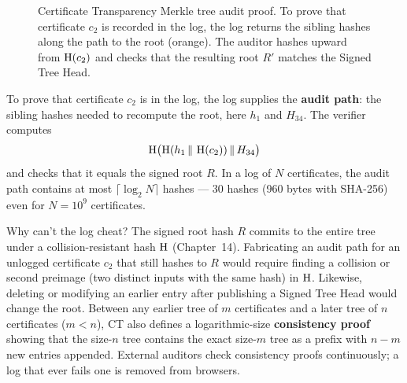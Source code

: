 \begin{figure}[htbp]
\caption{Certificate Transparency Merkle tree audit proof. To prove that certificate $c_2$ is recorded in the log, the log returns the sibling hashes along the path to the root (orange). The auditor hashes upward from $\operatorname{H}(c_2)$ and checks that the resulting root $R'$ matches the Signed Tree Head.}
\label{ch24:fig-ct-tree}
\end{figure}

To prove that certificate $c_2$ is in the log, the log supplies the \textbf{audit path}: the sibling hashes needed to recompute the root, here $h_1$ and $H_{34}$. The verifier computes
\[
\operatorname{H}\bigl(\operatorname{H}(h_1 \,\|\, \operatorname{H}(c_2)) \,\|\, H_{34}\bigr)
\]
and checks that it equals the signed root $R$. In a log of $N$ certificates, the audit path contains at most $\lceil \log_2 N \rceil$ hashes --- 30 hashes (960 bytes with SHA-256) even for $N = 10^9$ certificates.

\begin{whybox}
Why can't the log cheat? The signed root hash $R$ commits to the entire tree under a collision-resistant hash $\operatorname{H}$ (Chapter~14). Fabricating an audit path for an unlogged certificate $c_2$ that still hashes to $R$ would require finding a collision or second preimage (two distinct inputs with the same hash) in $\operatorname{H}$. Likewise, deleting or modifying an earlier entry after publishing a Signed Tree Head would change the root. Between any earlier tree of $m$ certificates and a later tree of $n$ certificates ($m < n$), CT also defines a logarithmic-size \textbf{consistency proof} showing that the size-$n$ tree contains the exact size-$m$ tree as a prefix with $n - m$ new entries appended. External auditors check consistency proofs continuously; a log that ever fails one is removed from browsers.
\end{whybox}

